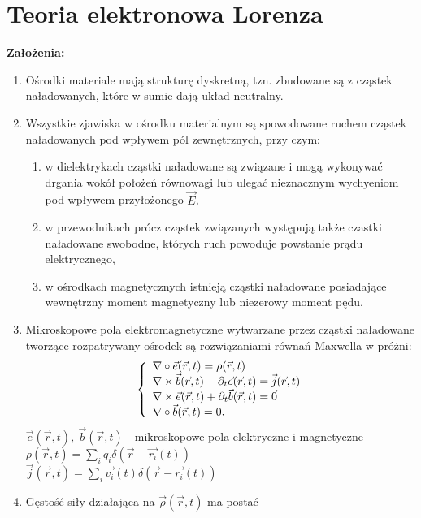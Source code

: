 \section{Teoria elektronowa Lorenza}
\textbf{Założenia:}
\begin{enumerate}
	\item Ośrodki materiale mają strukturę dyskretną, tzn. zbudowane są z 
		cząstek naładowanych, które w sumie dają układ neutralny.
	\item Wszystkie zjawiska w ośrodku materialnym są spowodowane ruchem 
		cząstek naładowanych pod wpływem pól zewnętrznych, przy czym:
		\begin{enumerate}
			\item w dielektrykach cząstki naładowane są związane i mogą
				wykonywać drgania wokół położeń równowagi lub ulegać
				nieznacznym wychyeniom pod wpływem przyłożonego $\vec{E}$,
			\item w przewodnikach prócz cząstek związanych występują także
				czastki naładowane swobodne, których ruch powoduje 
				powstanie prądu elektrycznego,
			\item w ośrodkach magnetycznych istnieją cząstki naładowane 
				posiadające wewnętrzny moment magnetyczny lub niezerowy
				moment pędu.
		\end{enumerate}
	\item Mikroskopowe pola elektromagnetyczne wytwarzane przez cząstki 
		naładowane tworzące rozpatrywany ośrodek są rozwiązaniami 
		równań Maxwella w próżni:\\
	\begin{equation}{\label{Max_mikro}}
	\left\{ 
		\begin{array}{l}
		\nabla \circ \vec{e} (\vec{r},t) = \rho(\vec{r},t)\\
		\nabla \times \vec{b}(\vec{r},t) - \partial_t \vec{e}(\vec{r},t) 
			= \vec{j}(\vec{r},t)\\
		\nabla \times \vec{e} (\vec{r},t) + \partial_t \vec{b} (\vec{r},t)
			= \vec{0} \\
		\nabla \circ \vec{b} (\vec{r},t) = 0.
		\end{array}
	\right.
	\end{equation}
	$\vec{e}(\vec{r},t), \ \vec{b}(\vec{r},t)$  - mikroskopowe pola elektryczne i
		magnetyczne \\
	$\rho (\vec{r},t)= \sum_i q_i \delta (\vec{r} -  \vec{r_i} (t))$\\
	$\vec{j}(\vec{r},t)= \sum_i \vec{v_i} (t) \delta(\vec{r} - \vec{r_i}(t))$
	\item Gęstość siły działająca na $\vec{\rho}(\vec{r},t)$ ma postać

\end{enumerate}

